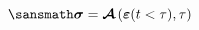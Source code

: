 \documentclass[preview]{standalone}
\begin{document}
$ \displaystyle \sansmath
  \boldsymbol{\sigma} = \boldsymbol{\mathcal{A}}\left( \boldsymbol{\varepsilon}(t<\tau), \tau \right)
$
\end{document}
